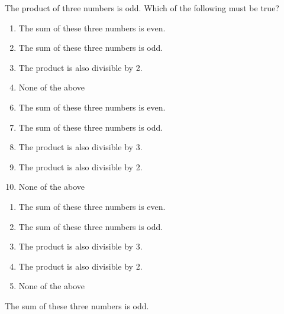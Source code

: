 

  The product of three numbers is odd.  Which of the following must be true?


\ifsat
	\begin{enumerate}[label=\Alph*)]
		\item   The sum of these three numbers is even.
		\item  The sum of these three numbers is odd.%
		\item   The product is also divisible by 2.
		\item  None of the above
	\end{enumerate}
\else
\fi

\ifacteven
	\begin{enumerate}[label=\textbf{\Alph*.},itemsep=\fill,align=left]
		\setcounter{enumii}{5}
		\item   The sum of these three numbers is even.
		\item  The sum of these three numbers is odd.%
		\item  The product is also divisible by 3.
		\addtocounter{enumii}{1}
		\item   The product is also divisible by 2.
		\item  None of the above
	\end{enumerate}
\else
\fi

\ifactodd
	\begin{enumerate}[label=\textbf{\Alph*.},itemsep=\fill,align=left]
		\item   The sum of these three numbers is even.
		\item  The sum of these three numbers is odd.%
		\item  The product is also divisible by 3.
		\item   The product is also divisible by 2.
		\item  None of the above
	\end{enumerate}
\else
\fi

\ifgridin
  The sum of these three numbers is odd.%
		
\else
\fi

